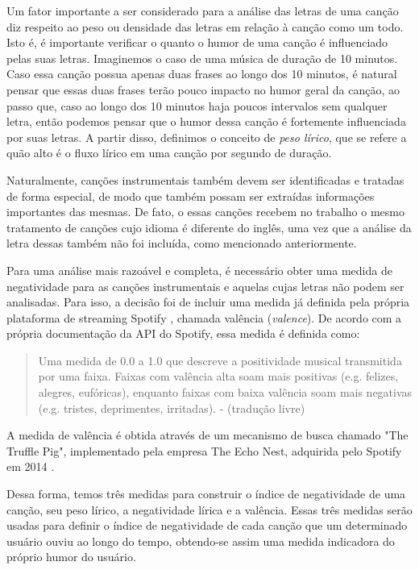 Um fator importante a ser considerado para a análise das letras de uma canção
diz respeito ao peso ou densidade das letras em relação à canção como um todo.
Isto é, é importante verificar o quanto o humor de uma canção é influenciado
pelas suas letras. Imaginemos o caso de uma música de duração de 10 minutos. 
Caso essa canção possua apenas duas frases ao longo dos 10 minutos, é natural
pensar que essas duas frases terão pouco impacto no humor geral da canção, ao
passo que, caso ao longo dos 10 minutos haja poucos intervalos sem qualquer
letra, então podemos pensar que o humor dessa canção é fortemente 
influenciada por suas letras. A partir disso, definimos o conceito de 
\textit{peso lírico}, que se refere a quão alto é o fluxo lírico em uma canção
por segundo de duração.

Naturalmente, canções instrumentais também devem ser identificadas
e tratadas de forma especial, de modo que também possam ser extraídas 
informações importantes das mesmas. De fato, o essas canções recebem no
trabalho o mesmo tratamento de canções cujo idioma é diferente do inglês,
uma vez que a análise da letra dessas também não foi incluída, como
mencionado anteriormente.

Para uma análise mais razoável e completa, é necessário obter uma medida de
negatividade para as canções instrumentais e aquelas cujas letras não podem
ser analisadas. Para isso, a decisão foi de incluir uma medida já definida
pela própria plataforma de streaming Spotify \cite{spotifyvalence}, chamada
valência (\textit{valence}). De acordo com a própria documentação da API do
Spotify, essa medida é definida como:

\begin{quote}
	Uma medida de 0.0 a 1.0 que descreve a positividade musical transmitida
	por uma faixa. Faixas com valência alta soam mais positivas (e.g. felizes,
	alegres, eufóricas), enquanto faixas com baixa valência soam mais
	negativas (e.g. tristes, deprimentes, irritadas). - (tradução livre)
\end{quote}

A medida de valência é obtida através de um mecanismo de busca chamado
"The Truffle Pig", implementado pela empresa The Echo Nest, adquirida
pelo Spotify em 2014 \cite{spotifyecho} \cite{theechonest}
\cite{theechonestpage}.

Dessa forma, temos três medidas para construir o índice de negatividade de
uma canção, seu peso lírico, a negatividade lírica e a valência. Essas três
medidas serão usadas para definir o índice de negatividade de cada canção
que um determinado usuário ouviu ao longo do tempo, obtendo-se assim uma
medida indicadora do próprio humor do usuário.

